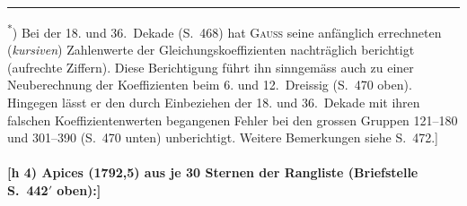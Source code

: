 \documentclass[12pt,a4paper]{article}
\theoremstyle{plain}
\theoremstyle{definition}
\theoremstyle{remark}
\begin{document}
\medskip
\noindent\rule{\textwidth}{0.4pt}
\begin{footnotesize}
\textsuperscript{*}) Bei der 18. und 36.~Dekade (S.~468) hat \textsc{Gau\ss} seine anf\"anglich
errechneten (\textit{kursiven}) Zahlenwerte der Gleichungskoeffizienten nachtr\"aglich
berichtigt (aufrechte Ziffern). Diese Berichtigung f\"uhrt ihn sinngem\"ass auch zu
einer Neuberechnung der Koeffizienten beim 6. und 12.~Dreissig (S.~470 oben).
Hingegen l\"asst er den durch Einbeziehen der 18. und 36.~Dekade mit ihren
falschen Koeffizientenwerten begangenen Fehler bei den grossen Gruppen
121--180 und 301--390 (S.~470 unten) unberichtigt. Weitere Bemerkungen
siehe S.~472.]
\end{footnotesize}

\newpage
\paragraph*{[h 4) Apices (1792,5) aus je 30 Sternen der Rangliste (Briefstelle S.~442$'$ oben):]}
\end{document}
